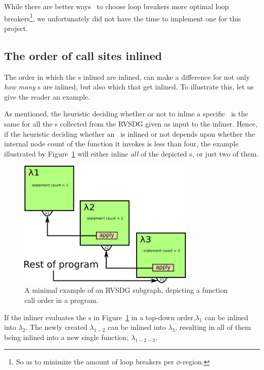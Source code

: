 While there are better ways~\cite{BasMscThesis} to choose loop breakers more
optimal loop breakers\footnote{So as to minimize the amount of loop breakers per
$\phi$-region.}, we unfortunately did not have the time to implement one for
this project.

\subsection{The order of call sites inlined}
\label{sub:scheme:ordering_apply_nodes}

The order in which the \applyNode s inlined are inlined, can make a difference
for not only \textit{how many} \applyNode s are inlined, but also which that get
inlined. To illustrate this, let us give the reader an example.

As mentioned, the heuristic deciding whether or not to inline a specific
\applyNode~is the same for all the \applyNode s collected from the RVSDG given
as input to the inliner. Hence, if the heuristic deciding whether an
\applyNode~is inlined or not depends upon whether the internal node count of the
function it invokes is less than four, the example illustrated by
Figure~\ref{fig:inline_ordering_ex} will either inline \textit{all} of the
depicted \applyNode s, or just two of them.


\begin{figure}[H]
	\centering
	\includegraphics[width=0.75\textwidth]{figures/inline_ordering_ex}
	\caption{A minimal example of an RVSDG subgraph, depicting a function call
order in a program.}
	\label{fig:inline_ordering_ex}
\end{figure}

If the inliner evaluates the \applyNode s in Figure~\ref{fig:inline_ordering_ex}
in a top-down order,$\lambda_1$ can be inlined into $\lambda_2$. The newly
created $\lambda_{1-2}$ can be inlined into $\lambda_3$, resulting in all of
them being inlined into a new single function; $\lambda_{1-2-3}$.

